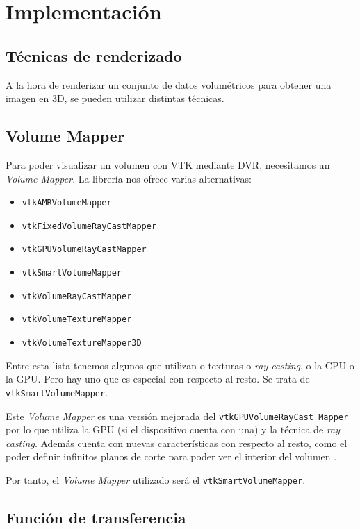 \chapter{Implementación}

\section{Técnicas de renderizado}

A la hora de renderizar un conjunto de datos volumétricos para obtener una imagen en 3D, se pueden utilizar distintas técnicas.


\section{Volume Mapper}

Para poder visualizar un volumen con VTK mediante DVR, necesitamos un \textit{Volume Mapper}. La librería nos ofrece varias alternativas:
\begin{itemize}
	\item \texttt{vtkAMRVolumeMapper}
	\item \texttt{vtkFixedVolumeRayCastMapper}
	\item \texttt{vtkGPUVolumeRayCastMapper}
	\item \texttt{vtkSmartVolumeMapper}
	\item \texttt{vtkVolumeRayCastMapper}
	\item \texttt{vtkVolumeTextureMapper}
	\item \texttt{vtkVolumeTextureMapper3D}
\end{itemize}

Entre esta lista tenemos algunos que utilizan o texturas o \textit{ray casting}, o la CPU o la GPU. Pero hay uno que es especial con respecto al resto. Se trata de \texttt{vtkSmartVolumeMapper}.

Este \textit{Volume Mapper} es una versión mejorada del \texttt{vtkGPUVolumeRayCast Mapper} por lo que utiliza la GPU (si el dispositivo cuenta con una) y la técnica de \textit{ray casting}. Además cuenta con nuevas características con respecto al resto, como el poder definir infinitos planos de corte para poder ver el interior del volumen \cite{smart_volume_mapper}.

Por tanto, el \textit{Volume Mapper} utilizado será el \texttt{vtkSmartVolumeMapper}.

\section{Función de transferencia}

